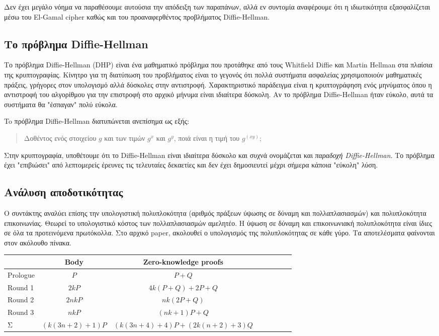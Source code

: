 \documentclass[letterpaper,11pt]{article}
\begin{document}
Δεν έχει μεγάλο νόημα να παραθέσουμε αυτούσια την απόδειξη των παραπάνων, αλλά εν συντομία αναφέρουμε ότι η ιδιωτικότητα εξασφαλίζεται μέσω του
El-Gamal cipher καθώς και του προαναφερθέντος προβλήματος Diffie-Hellman.

\subsection{Το πρόβλημα Diffie-Hellman}

Το πρόβλημα Diffie-Hellman (DHP) είναι ένα μαθηματικό πρόβλημα που προτάθηκε από τους Whitfield Diffie και Martin Hellman στα πλαίσια της
κρυπτογραφίας. Κίνητρο για τη διατύπωση του προβλήματος είναι το γεγονός ότι πολλά συστήματα ασφαλείας χρησιμοποιούν μαθηματικές πράξεις, γρήγορες
στον υπολογισμό αλλά δύσκολες στην αντιστροφή. Χαρακτηριστικό παράδειγμα είναι η κρυπτογράφηση ενός μηνύματος όπου η αντιστροφή του αλγορίθμου για
την επιστροφή στο αρχικό μήνυμα είναι ιδιαίτερα δύσκολη. Αν το πρόβλημα Diffie-Hellman ήταν εύκολο, αυτά τα συστήματα θα "έσπαγαν" πολύ εύκολα.

To πρόβλημα Diffie-Hellman διατυπώνεται ανεπίσημα ως εξής:

 \begin{quote} Δοθέντος ενός στοιχείου $g$ και των τιμών $g^x$ και $g^y$, ποιά είναι η τιμή του $g^(xy)$; \end{quote}

Στην κρυπτογραφία, υποθέτουμε ότι το Diffie-Hellman είναι ιδιαίτερα δύσκολο και συχνά ονομάζεται και \emph{παραδοχή Diffie-Hellman}. Το πρόβλημα
έχει "επιβιώσει" από λεπτομερείς έρευνες τις τελευταίες δεκαετίες και δεν έχει δημοσιευτεί μέχρι σήμερα κάποια "εύκολη" λύση.

\subsection{Ανάλυση αποδοτικότητας}

Ο συντάκτης αναλύει επίσης την υπολογιστική πολυπλοκότητα (αριθμός πράξεων ύψωσης σε δύναμη και πολλαπλασιασμών) και πολυπλοκότητα επικοινωνίας.
Θεωρεί το υπολογιστικό κόστος των πολλαπλασιασμών αμελητέο. Η ύψωση σε δύναμη και επικοινωνιακή πολυπλοκότητα είναι ίδιες σε όλα τα
προτεινόμενα πρωτόκολλα. Στο αρχικό paper, ακολουθεί ο υπολογισμός της πολυπλοκότητας σε κάθε γύρο. Τα αποτελέσματα φαίνονται στον ακόλουθο πίνακα.

\begin{center}
\begin{tabular}{l*{6}{c}r}
		& Body 	& Zero-knowledge proofs\\
	\hline
	Prologue	& $P$ 				& $P+Q$				\\
	Round 1		& $2kP$				& $4k(P+Q)+2P+Q$	\\
	Round 2		& $2nkP$			& $nk(2P+Q)$		\\
	Round 3		& $nkP$				& $(nk+1)P+Q$		\\
	Σ			& $(k(3n+2)+1)P$	& $(k(3n+4)+4)P+(2k(n+2)+3)Q$\\	
\end{tabular}
\end{center}
\end{document}
